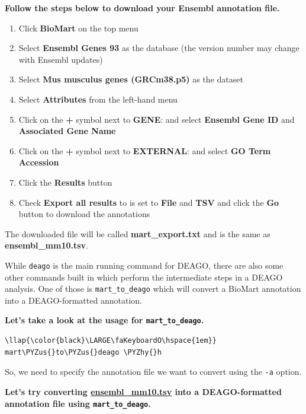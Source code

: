 \documentclass[11pt]{article}
\providecommand{\tightlist}{%
      \setlength{\itemsep}{0pt}\setlength{\parskip}{0pt}}
\def\PYZus{\char`\_}
\def\PYZhy{\char`\-}
\begin{document}
\textbf{Follow the steps below to download your Ensembl annotation
file.}

\begin{enumerate}
\def\labelenumi{\arabic{enumi}.}
\tightlist
\item
  Click \textbf{BioMart} on the top menu
\item
  Select \textbf{Ensembl Genes 93} as the database (the version number
  may change with Ensembl updates)
\item
  Select \textbf{Mus musculus genes (GRCm38.p5)} as the dataset
\item
  Select \textbf{Attributes} from the left-hand menu
\item
  Click on the \textbf{+} symbol next to \textbf{GENE}: and select
  \textbf{Ensembl Gene ID} and \textbf{Associated Gene Name}
\item
  Click on the \textbf{+} symbol next to \textbf{EXTERNAL}: and select
  \textbf{GO Term Accession}
\item
  Click the \textbf{Results} button
\item
  Check \textbf{Export all results} to is set to \textbf{File} and
  \textbf{TSV} and click the \textbf{Go} button to download the
  annotations
\end{enumerate}

The downloaded file will be called \textbf{mart\_export.txt} and is the
same as \textbf{ensembl\_mm10.tsv}.

While \texttt{deago} is the main running command for DEAGO, there are
also some other commands built in which perform the intermediate steps
in a DEAGO analysis. One of those is \texttt{mart\_to\_deago} which will
convert a BioMart annotation into a DEAGO-formatted annotation.

\textbf{Let's take a look at the usage for \texttt{mart\_to\_deago}.}

\begin{terminalinput}
\begin{Verbatim}[commandchars=\\\{\}]
\llap{\color{black}\LARGE\faKeyboardO\hspace{1em}} mart\PYZus{}to\PYZus{}deago \PYZhy{}h
\end{Verbatim}
\end{terminalinput}

    So, we need to specify the annotation file we want to convert using the
\texttt{-a} option.

\textbf{Let's try converting
\href{deago_tutorial/ensembl_mm10.tsv}{ensembl\_mm10.tsv} into a
DEAGO-formatted annotation file using \texttt{mart\_to\_deago}.}
\end{document}
